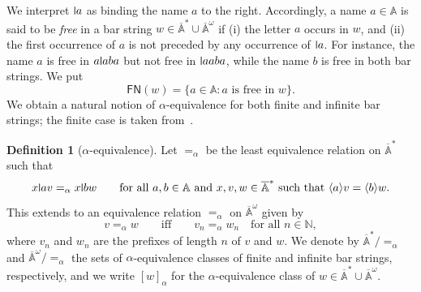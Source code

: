 \documentclass[10pt,a4paper]{amsart}
\newcommand{\midmid}{\hspace{0.2ex}{\rule[-0.1ex]{0.6pt}{1.65ex}}\hspace{0.2ex}}
\newcommand{\compr}{:}
\newcommand{\newletter}[1]{{\midmid}#1}
\newcommand{\free}[1]{\mathsf{FN}(#1)}
\newcommand{\barA}{\overline{\names}}
\numberwithin{equation}{section}
\newcommand{\braket}[1]{\langle #1 \rangle}
\newcommand{\Nat}{{\mathbb{N}}}
\newcommand{\+}[1]{\mathcal{#1}\xspace}
\newcommand{\names}{\mathbb{A}}
\theoremstyle{definition}
\newtheorem{defn}[theorem]{Definition}
\begin{document}
We interpret $\newletter a$ as binding the name $a$ to the right. Accordingly, a name $a\in \names$ is said to be \emph{free} in a bar string $w\in \barA^*\cup \barA^\omega$ if (i) the letter $a$ occurs in $w$, and (ii) the first occurrence of $a$ is not preceded by any occurrence of $\newletter a$. For instance, the name $a$ is free in $a\newletter aba$ but not free in $\newletter aaba$, while the name $b$ is free in both bar strings. We put 
\[\free{w} = \{ a\in \names\compr \text{$a$ is free in $w$} \}. \]
We obtain a natural notion of $\alpha$-equivalence for both finite and infinite bar strings; the finite case is taken from~\cite{SchroderEA17}.

\begin{defn}[$\alpha$-equivalence]\label{def:alpha-fin}
  Let $=_\alpha$ be the least equivalence relation on $\barA^*$ such that
  \[
    x\newletter av =_\alpha x\newletter bw
    \qquad
    \text{for all $a,b\in \names$ and $x,v,w\in \barA^*$ such that
      $\braket{a} v = \braket{b} w$}.
  \]
This extends to an equivalence relation $=_\alpha$ on $\barA^\omega$  given by \[v=_\alpha w \qquad\text{iff}\qquad v_n=_\alpha w_n \quad\text{for all $n\in \Nat$},\] 
where $v_n$ and $w_n$ are the prefixes of length $n$ of $v$ and $w$. We denote by $\barA^*/\mathord{=_\alpha}$ and $\barA^\omega/\mathord{=_\alpha}$ the sets of $\alpha$-equivalence classes of finite and infinite bar strings, respectively, and we write $[w]_\alpha$ for the $\alpha$-equivalence class of $w\in \barA^*\cup \barA^\omega$.
\end{defn}
%
\end{document}
